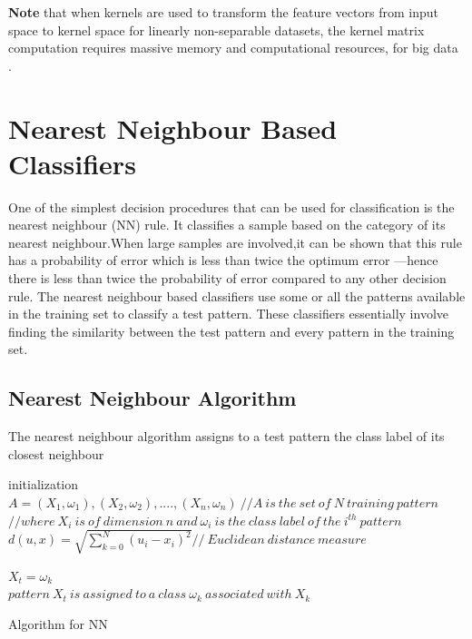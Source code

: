 \textbf{
Note} that when kernels are used to transform the feature vectors from input space to kernel space for linearly non-separable datasets, the kernel matrix computation requires massive memory and computational
resources, for big data . 



\section{Nearest Neighbour Based Classifiers}

One of the simplest decision procedures that can be used for classification is the
nearest neighbour (NN) rule. It classifies a sample based on the category of its nearest
neighbour.When large samples are involved,it can be shown that this rule has a
probability of error which is less than twice the optimum error
—hence there is less
than twice the probability of error compared to any other decision rule. The nearest
neighbour based classifiers use some or all the patterns available in the training set
to classify a test pattern. These classifiers essentially involve finding the similarity
between the test pattern and every pattern in the training set.

\subsection{Nearest Neighbour Algorithm}
The nearest neighbour algorithm assigns to a test pattern the class label of its closest
neighbour


\begin{algorithm}[H]
\SetAlgoLined

 initialization\;
 $ A=(X_{1},\omega_{1}),(X_{2},\omega_{2}),....,(X_{n},\omega_{n}) \ // A\ is\ the\ set\ of\ N\ training\ pattern $\\
 
 
$ //where\  X_{i}\ is\ of\ dimension\ n\ and\  \omega_{i}\ is\ the\ class\ label\ of\ the\ i^{th}\ pattern $\\
 
 
 $d(u,x) = \sqrt{\sum_{k=0}^{N} (u_{i}-x_{i})^{2}}  // \ Euclidean\ distance\ measure $\\ 

 
 $ X_{t} = \omega_{k} $ \\
 
 $ pattern\ X_{t}\ is\ assigned\ to\ a\ class\ \omega_{k}\ associated\ with\  X_{k} $
 
 \caption{Algorithm for NN}
\end{algorithm}

